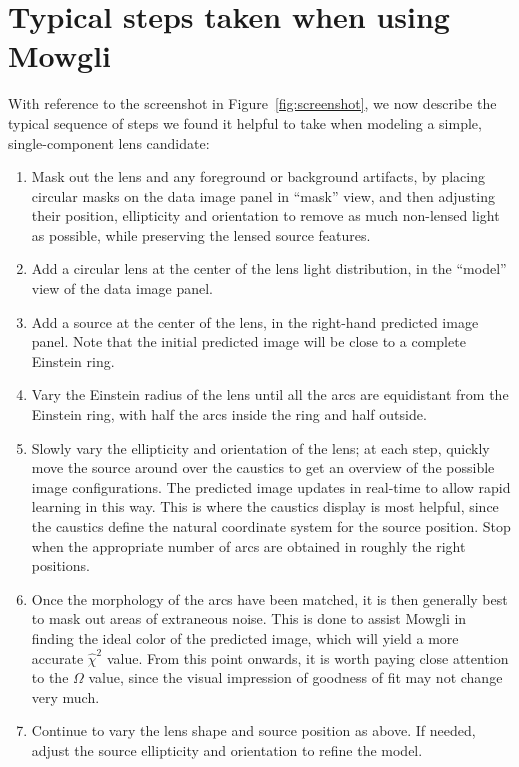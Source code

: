 \documentclass[iop]{emulateapj}
\def\rchisq{\hat{\chi}^2}
\def\theapplet{{\sc Mowgli}\xspace}
\begin{document}

\section{Typical steps taken when using \theapplet}
\label{sec:manual}

With reference to the screenshot in Figure~\ref{fig:screenshot}, we now
describe the typical sequence of steps we found it helpful to take when
modeling a simple, single-component lens candidate: 

\begin{enumerate}
 \item Mask out the lens and any foreground or background artifacts, by
 placing circular masks on the data image panel in ``mask'' view, and then
 adjusting their position, ellipticity and orientation to remove as much
 non-lensed light as possible, while preserving the lensed source features.
 \item Add a circular lens at the center of the lens light distribution, in
 the ``model'' view of the data image panel.
 \item Add a source at the center of the lens, in the right-hand predicted
 image panel. Note that the initial predicted image will be close to a 
 complete Einstein ring.
 \item Vary the Einstein radius of the lens until all the arcs are
 equidistant from the Einstein ring, with half the arcs inside the ring and
 half outside.
 \item Slowly vary the ellipticity and
 orientation of the lens; at each step, quickly move the source around over the
 caustics to get an overview of the possible image configurations. 
 The predicted image updates in real-time to allow rapid learning in this way.
 This is where the caustics display is most
 helpful, since the caustics define  the natural coordinate system for the
 source position.
 Stop when the appropriate number of arcs are obtained in
 roughly the right positions. 
 \item Once the morphology of the arcs have been matched, it is then  generally
 best to mask out areas of extraneous noise. This is done to assist \theapplet
 in finding the ideal color of the predicted image, which will yield a more
 accurate $\rchisq$ value. From this point onwards, it is worth paying  close
 attention to the $\Omega$ value, since the visual impression of goodness of fit
 may not change very much. 
 \item Continue to vary the lens shape and source position as above. If needed, 
 adjust the source ellipticity and orientation to refine the model.
\end{enumerate}
\end{document}
